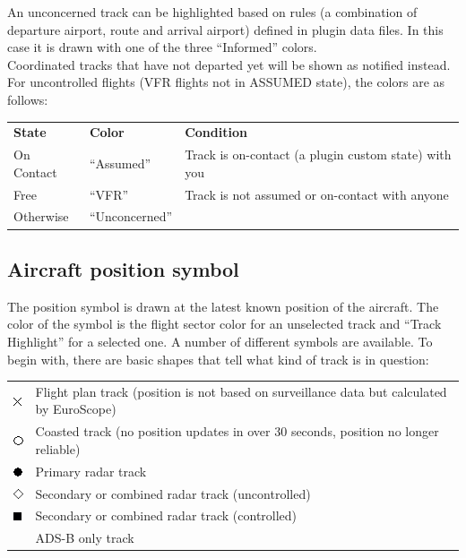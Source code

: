 \documentclass[11pt,a4paper,oldfontcommands]{memoir}
\begin{document}
An unconcerned track can be highlighted based on rules (a combination of departure airport, route and
arrival airport) defined in plugin data files. In this case it is drawn with one of the three “Informed” colors.\\

Coordinated tracks that have not departed yet will be shown as notified instead.\\

For uncontrolled flights (VFR flights not in ASSUMED state), the colors are as follows:\\
\begin{tabular}{l l l}
\textbf{State}  & \textbf{Color}    & \textbf{Condition}
\\On Contact    & “Assumed”         & Track is on-contact (a plugin custom state) with you
\\Free          & “VFR”             & Track is not assumed or on-contact with anyone
\\Otherwise     & “Unconcerned”     &
\end{tabular}

\subsection{Aircraft position symbol}
The position symbol is drawn at the latest known position of the aircraft. The color of the symbol is the
flight sector color for an unselected track and “Track Highlight” for a selected one. A number of different
symbols are available. To begin with, there are basic shapes that tell what kind of track is in question:

\begin{tabular}{l l}
\includegraphics{img/rps_fpasd.png} & Flight plan track (position is not based on surveillance data but calculated by EuroScope)
\\\includegraphics{img/rps_coast.png} & Coasted track (no position updates in over 30 seconds, position no longer reliable)
\\\includegraphics{img/rps_psr.png} & Primary radar track
\\\includegraphics{img/rps_sec.png} & Secondary or combined radar track (uncontrolled)
\\\includegraphics{img/rps_psr+ssr.png} & Secondary or combined radar track (controlled)
\\ & ADS-B only track
\end{tabular}
\end{document}
